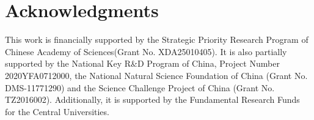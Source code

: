 \documentclass[mathpazo]{cicp}
\begin{document}


\section*{Acknowledgments}
This work is financially supported by the Strategic Priority Research Program of Chinese Academy of Sciences(Grant No. XDA25010405). It is also partially  supported by the National Key R\&D Program of China, Project Number 2020YFA0712000, the National Natural Science Foundation of China (Grant No. DMS-11771290) and the Science Challenge Project of China (Grant No. TZ2016002). Additionally, it is supported by the Fundamental Research Funds for the Central Universities. 


 
 
\end{document}
